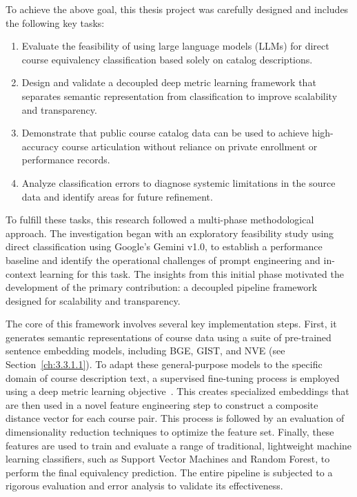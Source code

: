 To achieve the above goal, this thesis project was carefully designed and includes the following key tasks:
\begin{enumerate}
    \item Evaluate the feasibility of using large language models (LLMs) for direct course equivalency classification based solely on catalog descriptions.
    \item Design and validate a decoupled deep metric learning framework that separates semantic representation from classification to improve scalability and transparency.
    \item Demonstrate that public course catalog data can be used to achieve high-accuracy course articulation without reliance on private enrollment or performance records.
    \item Analyze classification errors to diagnose systemic limitations in the source data and identify areas for future refinement.
\end{enumerate}
To fulfill these tasks, this research followed a multi-phase methodological approach. The investigation began with an exploratory feasibility study using direct classification using Google's Gemini v1.0, to establish a performance baseline and identify the operational challenges of prompt engineering and in-context learning for this task. The insights from this initial phase motivated the development of the primary contribution: a decoupled pipeline framework designed for scalability and transparency.

The core of this framework involves several key implementation steps. First, it generates semantic representations of course data using a suite of pre-trained sentence embedding models, including BGE, GIST, and NVE (see Section~\ref{ch:3.3.1.1}). To adapt these general-purpose models to the specific domain of course description text, a supervised fine-tuning process is employed using a deep metric learning objective~\cite{sym11091066}. This creates specialized embeddings that are then used in a novel feature engineering step to construct a composite distance vector for each course pair. This process is followed by an evaluation of dimensionality reduction techniques to optimize the feature set. Finally, these features are used to train and evaluate a range of traditional, lightweight machine learning classifiers, such as Support Vector Machines and Random Forest, to perform the final equivalency prediction. The entire pipeline is subjected to a rigorous evaluation and error analysis to validate its effectiveness. 

